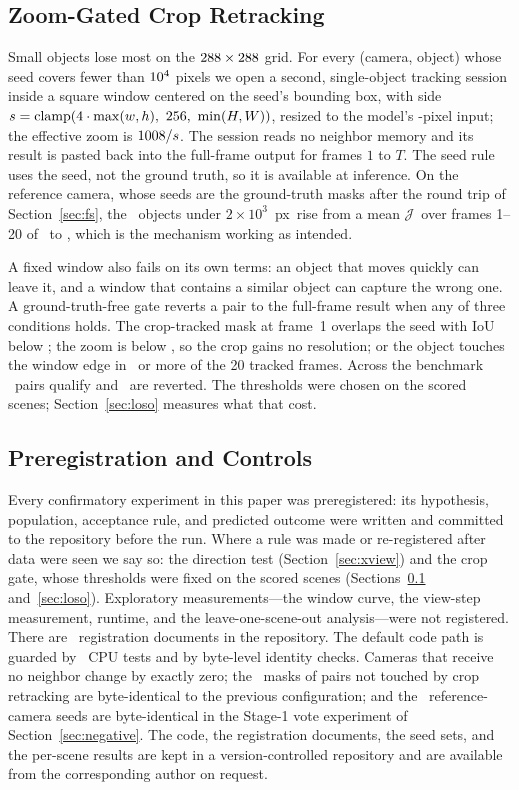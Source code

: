 \documentclass[journal]{IEEEtran}
\newcommand{\Jscore}{\ensuremath{\mathcal{J}}}
\newcommand{\px}{~px}
\begin{document}
\subsection{Zoom-Gated Crop Retracking}
\label{sec:crop}
Small objects lose most on the $288\times288$ grid. For every (camera, object)
whose seed covers fewer than $10^{4}$ pixels we open a second, single-object
tracking session inside a square window centered on the seed's bounding box,
with side $s=\mathrm{clamp}(\cropScale\cdot\max(w,h),\ \cropMinSide,\
\min(H,W))$, resized to the model's \modelInput-pixel input; the effective zoom
is $1008/s$. The session reads no neighbor memory and its result is
pasted back into the full-frame output for frames $1$ to $T$. The seed rule
uses the seed, not the ground truth, so it is available at inference. On the
reference camera, whose seeds are the ground-truth masks after the round trip
of Section~\ref{sec:fs}, the \nCropRefSmall\ objects
under $2\times10^{3}$\px\ rise from a mean \Jscore\ over frames 1--20 of
\cropRefSmallBefore\ to \cropRefSmallAfter, which is the mechanism working as
intended.

A fixed window also fails on its own terms: an object that moves quickly can
leave it, and a window that contains a similar object can capture the wrong
one. A ground-truth-free
gate reverts a pair to the full-frame result when any of three conditions
holds. The crop-tracked mask at frame~1 overlaps the seed with IoU below
\gateIoU; the zoom is below \gateZoom, so the crop gains no resolution; or the
object touches the window edge in \gateBorder\ or more of the 20 tracked frames.
Across the benchmark \nCropTargets\ pairs qualify and \nCropReverted\ are
reverted. The thresholds were chosen on the scored scenes; Section~\ref{sec:loso}
measures what that cost.

\subsection{Preregistration and Controls}
\label{sec:prereg}
Every confirmatory experiment in this paper was preregistered: its
hypothesis, population, acceptance rule, and predicted outcome were written and
committed to the repository before the run. Where a rule was made or
re-registered after data were seen we say so: the direction test
(Section~\ref{sec:xview}) and the crop gate, whose thresholds were fixed on the
scored scenes (Sections~\ref{sec:crop} and~\ref{sec:loso}). Exploratory
measurements---the window curve, the view-step measurement, runtime, and the
leave-one-scene-out analysis---were not registered. There are \nPrereg\
registration documents in the repository. The default code path is guarded by
\nTests\ CPU tests and by byte-level identity checks. Cameras that receive no
neighbor change by exactly zero; the \nByteNontarget\ masks of pairs not
touched by crop retracking are byte-identical to the previous configuration;
and the \nByteSeeds\ reference-camera seeds are byte-identical in the Stage-1
vote experiment of Section~\ref{sec:negative}. The code, the registration
documents, the seed sets, and the per-scene results are kept in a
version-controlled repository and are available from the corresponding author
on request.
\end{document}
